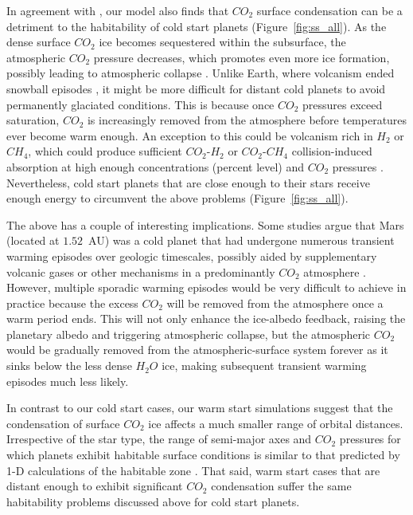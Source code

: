 \documentclass[fleqn,usenatbib]{mnras}
\begin{document}
In agreement with \citet{Turbet2017}, our model also finds that $CO_{\mathrm{2}}$ surface condensation can be a detriment to the habitability of cold start planets (Figure~\ref{fig:ss_all}). As the dense surface $CO_{\mathrm{2}}$ ice becomes sequestered within the subsurface, the atmospheric $CO_{\mathrm{2}}$ pressure decreases, which promotes even more ice formation, possibly leading to atmospheric collapse \citep{Turbet2017} . Unlike Earth, where volcanism ended snowball episodes \citep{Hoffman1342}, it might be more difficult for distant cold planets to avoid permanently glaciated conditions. This is because once $CO_{\mathrm{2}}$ pressures exceed saturation, $CO_{\mathrm{2}}$ is increasingly removed from the atmosphere before temperatures ever become warm enough. An exception to this could be volcanism rich in $H_{\mathrm{2}}$ or $CH_{\mathrm{4}}$, which could produce sufficient $CO_{\mathrm{2}}$-$H_{\mathrm{2}}$ or $CO_{\mathrm{2}}$-$CH_{\mathrm{4}}$ collision-induced absorption at high enough concentrations (percent level) and $CO_{\mathrm{2}}$ pressures \citep{ramirez2014,ramirez2017,ramirezkalt2018}. Nevertheless, cold start planets that are close enough to their stars receive enough energy to circumvent the above problems (Figure~\ref{fig:ss_all}). 

The above has a couple of interesting implications. Some studies argue that Mars (located at $1.52$~AU) was a cold planet that had undergone numerous transient warming episodes over geologic timescales, possibly aided by supplementary volcanic gases or other mechanisms in a predominantly $CO_{\mathrm{2}}$ atmosphere \citep{wordsworth2013,batalha2016}. However, multiple sporadic warming episodes would be very difficult to achieve in practice because the excess $CO_{\mathrm{2}}$ will be removed from the atmosphere once a warm period ends. This will not only enhance the ice-albedo feedback, raising the planetary albedo and triggering atmospheric collapse, but the atmospheric $CO_{\mathrm{2}}$ would be gradually removed from the atmospheric-surface system forever as it sinks below the less dense $H_{\mathrm{2}}O$ ice, making subsequent transient warming episodes much less likely. 

In contrast to our cold start cases, our warm start simulations suggest that the condensation of surface $CO_{\mathrm{2}}$ ice affects a much smaller range of orbital distances. Irrespective of the star type, the range of semi-major axes and $CO_{\mathrm{2}}$ pressures for which planets exhibit habitable surface conditions is similar to that predicted by 1-D calculations of the habitable zone \citep{kasting1993, Ramirez2018}. That said, warm start cases that are distant enough to exhibit significant $CO_{\mathrm{2}}$ condensation suffer the same habitability problems discussed above for cold start planets. 
\end{document}
